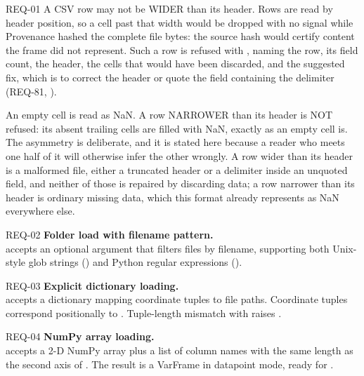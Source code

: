 \begin{reqbox}{REQ-01}{\stable}
A CSV row may not be WIDER than its header. Rows are read by header
position, so a cell past that width would be dropped with no signal while
Provenance hashed the complete file bytes: the source hash would certify
content the frame did not represent. Such a row is refused with
, naming the row, its field count, the header, the cells
that would have been discarded, and the suggested fix, which is to correct
the header or quote the field containing the delimiter (REQ-81,
).

An empty cell is read as NaN. A row NARROWER than its header is NOT
refused: its absent trailing cells are filled with NaN, exactly as an
empty cell is. The asymmetry is deliberate, and it is stated here because a
reader who meets one half of it will otherwise infer the other wrongly. A
row wider than its header is a malformed file, either a truncated header
or a delimiter inside an unquoted field, and neither of those is repaired
by discarding data; a row narrower than its header is ordinary missing
data, which this format already represents as NaN everywhere else.
\end{reqbox}

\begin{reqbox}{REQ-02}{\stable}
\textbf{Folder load with filename pattern.}\\
 accepts an optional 
argument that filters files by filename, supporting both Unix-style glob
strings () and Python regular expressions
().
\end{reqbox}

\begin{reqbox}{REQ-03}{\stable}
\textbf{Explicit dictionary loading.}\\
 accepts a
dictionary mapping coordinate tuples to file paths. Coordinate tuples
correspond positionally to . Tuple-length mismatch with
 raises .
\end{reqbox}

\begin{reqbox}{REQ-04}{\stable}
\textbf{NumPy array loading.}\\
 accepts a 2-D NumPy array plus a list
of column names with the same length as the second axis of .
The result is a VarFrame in datapoint mode, ready for .
\end{reqbox}


